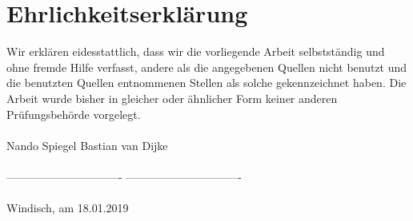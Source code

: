 \section*{Ehrlichkeitserklärung}
Wir erklären eidesstattlich, dass wir die vorliegende Arbeit selbstständig und ohne fremde Hilfe verfasst, andere als die angegebenen Quellen nicht benutzt und die benutzten Quellen entnommenen Stellen als solche gekennzeichnet haben. Die Arbeit wurde bisher in gleicher oder ähnlicher Form keiner anderen Prüfungsbehörde vorgelegt.\\\\

Nando Spiegel \hspace{8cm} Bastian van Dijke\vspace{2cm}\\\\
------------------------------- \hspace{6.45cm} -------------------------------\\\\



Windisch, am 18.01.2019 